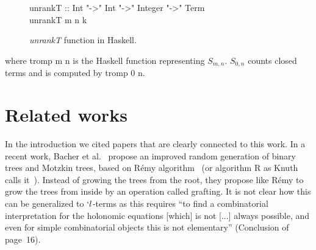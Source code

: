 \documentclass{sig-alternate}
\begin{document}
\begin{figure*}[!th]
  \begin{center}
    \begin{normalsize}
      \begin{haskell}
      \hspace*{-20pt}
        unrankT :: Int "->" Int "->" Integer "->" Term\\
        unrankT m n k \\
\hspace*{10pt}
      \end{haskell}
    \end{normalsize}
\end{center}
  \caption{\emph{unrankT} function in \textsf{Haskell}.}
  \label{fig:unrankT-prog}
\end{figure*}
\fi
where \<tromp m n\> is the \textsf{Haskell} function representing $S_{m,n}$.
$S_{0,n}$ counts closed terms and is computed by \<tromp 0 n\>.

\section{Related works}
\label{sec:works}

In the introduction we cited papers that are clearly connected to this work.  In a
recent work, Bacher et al.~\cite{DBLP:journals/corr/BacherBJ14} propose an improved
random generation of binary trees and Motzkin trees, based on R\'{e}my algorithm~\cite{DBLP:journals/ita/Remy85} (or
algorithm R as Knuth calls it~\cite{KnuthVol4_4}).  Instead of growing the trees from the root, they
propose like R\'{e}my to grow the trees from inside by an operation called grafting.
It is not clear how this can be generalized to $`l$-terms as this requires ``to find a
combinatorial interpretation for the holonomic equations [which] is not [...]
always possible, and even for simple combinatorial objects this is not elementary''
(Conclusion of \cite{DBLP:journals/corr/BacherBJ14} page~16).  
\end{document}
